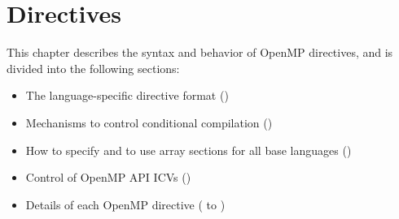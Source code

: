 %
%
%
%
%
%
%
%
%
%

\chapter{Directives}
\label{chap:Directives}
This chapter describes the syntax and behavior of OpenMP directives, and is divided 
into the following sections:

\begin{itemize}
\item The language-specific directive format 
()

\item Mechanisms to control conditional compilation 
()

\item How to specify and to use array sections for all base languages 
() 

\item Control of OpenMP API ICVs 
()

\item Details of each OpenMP directive 
( to 
)
\end{itemize}

